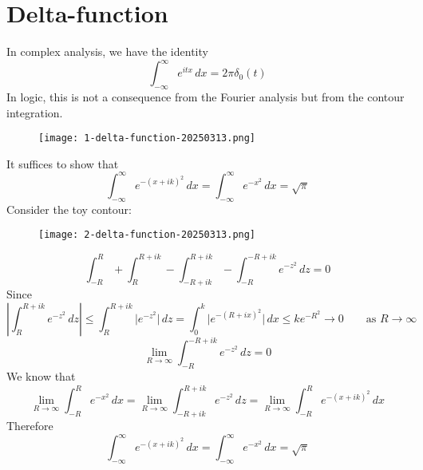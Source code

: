 \section{Delta-function}

In complex analysis, we have the identity
\[
\int_{-\infty}^{\infty} e^{ itx } \, dx =2\pi\delta_0(t)
\]
In logic, this is not a consequence from the Fourier analysis but from the contour integration.

\begin{figure}[H]
\centering
\texttt{[image: 1-delta-function-20250313.png]}
\label{}
\end{figure}

It suffices to show that
\[
\int_{-\infty}^{\infty} e^{ -(x+ik)^{2} } \, dx=\int_{-\infty }^{\infty} e^{ -x^{2} } \, dx=\sqrt{ \pi }
\]
Consider the toy contour:

\begin{figure}[H]
\centering
\texttt{[image: 2-delta-function-20250313.png]}
\label{}
\end{figure}
\[
\int_{-R}^{R}+\int_{R}^{R+ik}-\int_{-R+ik}^{R+ik}-\int_{-R}^{-R+ik} e^{ -z^{2} } \, dz=0 
\]
Since
\[
\left\lvert  \int_{R}^{R+ik} e^{ -z^{2} } \, dz   \right\rvert \leq \int_{R}^{R+ik} \lvert e^{ -z^{2} } \rvert  \, dz =\int_{0}^{k} \lvert e^{ -(R+ix)^{2} } \rvert  \, dx \leq ke^{ -R^{2} }\to0\qquad \text{as }R\to \infty
\]
\[
\lim_{ R \to \infty } \int_{-R}^{-R+ik} e^{ -z^{2} } \, dz =0
\]
We know that
\[
\lim_{ R \to \infty } \int_{-R}^{R} e^{ -x^{2} } \, dx=\lim_{ R \to \infty } \int_{-R+ik}^{R+ik} e^{ -z^{2} } \, dz =\lim_{ R \to \infty } \int_{-R}^{R} e^{ -(x+ik)^{2} } \, dx
\]
Therefore
\[
\int_{-\infty}^{\infty} e^{ -(x+ik)^{2} } \, dx =\int_{-\infty}^{\infty} e^{ -x^{2} } \, dx =\sqrt{ \pi }
\]